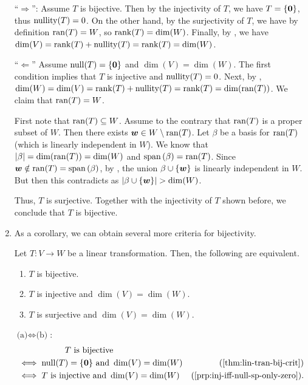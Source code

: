 \begin{enumerate}
\begin{pf}
``\(\Rightarrow\)'': Assume \(T\) is bijective. Then by the injectivity of
\(T\), we have \(\null{T}=\{\vect{0}\}\), thus \(\operatorname{nullity}(T)=0\). On the other
hand, by the surjectivity of \(T\), we have by definition \(\operatorname{ran}(T)=W\), so
\(\operatorname{rank}(T)=\dim(W)\). Finally, by , we have
\(\dim(V)=\operatorname{rank}(T)+\operatorname{nullity}(T)=\operatorname{rank}(T)=\dim(W)\).


``\(\Leftarrow\)'' Assume \(\operatorname{null}(T)=\{\vb*{0}\}\) and \(\dim(V)=\dim(W)\). The
first condition implies that \(T\) is injective and \(\operatorname{nullity}(T)=0\). Next, by
, \(\dim(W)=\dim(V)=\operatorname{rank}(T)+\operatorname{nullity}(T)=\operatorname{rank}(T)=\dim(\operatorname{ran}(T))\).
We claim that \(\operatorname{ran}(T)=W\).

\begin{pf}
First note that \(\operatorname{ran}(T)\subseteq W\). Assume to the contrary that \(\operatorname{ran}(T)\)
is a proper subset of \(W\). Then there exists \(\vb*{w}\in
W\setminus\operatorname{ran}(T)\).  Let \(\beta\) be a basis for \(\operatorname{ran}(T)\) (which is
linearly independent in \(W\)). We know that \(|\beta|=\dim(\operatorname{ran}(T))=\dim(W)\)
and \(\operatorname{span}\qty(\beta)=\operatorname{ran}(T)\). Since \(\vb*{w}\notin\operatorname{ran}(T)=\operatorname{span}\qty(\beta)\), by
, the union \(\beta\cup\{\vb*{w}\}\) is linearly
independent in \(W\). But then this contradicts  as
\(|\beta\cup\{\vect{w}\}|>\dim(W)\).
\end{pf}

Thus, \(T\) is surjective. Together with the injectivity of \(T\) shown
before, we conclude that \(T\) is bijective.
\end{pf}

\item As a corollary, we can obtain several more criteria for bijectivity.

\begin{corollary}
\label{cor:more-lt-bij-crit}
Let \(T:V\to W\) be a linear transformation. Then, the following are equivalent.
\begin{enumerate}
\item \(T\) is bijective.
\item \(T\) is injective and \(\dim(V)=\dim(W)\).
\item \(T\) is surjective and \(\dim(V)=\dim(W)\).
\end{enumerate}
\end{corollary}
\begin{pf}
\underline{\(\text{(a)}\iff\text{(b)}\)}:
\begin{align*}
&\hspace{2cm}\text{\(T\) is bijective} \\
&\iff\nul{T}=\{\vect{0}\}\text{ and }\dim(V)=\dim(W) &\text{(\Cref{thm:lin-tran-bij-crit})} \\
&\iff T\text{ is injective and }\dim(V)=\dim(W)&\text{(\Cref{prp:inj-iff-null-sp-only-zero})}.
\end{align*}


\end{pf}
\end{enumerate}

